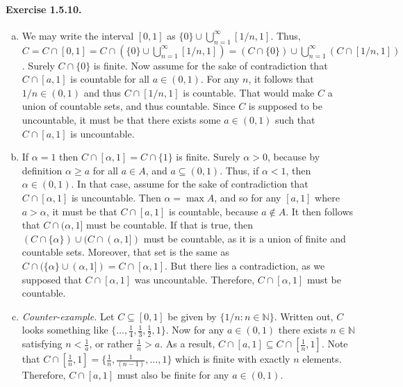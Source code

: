 \documentclass{article}
\newcommand{\N}{\mathbb{N}}
\begin{document}
\paragraph{Exercise 1.5.10.}
\begin{enumerate}[(a)]
    \item We may write the interval $[0,1]$ as $\{0\} \cup \bigcup_{n=1}^\infty [1/n,1]$. Thus, $C = C \cap [0,1] = C \cap \left(\{0\} \cup \bigcup_{n=1}^\infty [1/n,1]\right) = (C\cap\{0\}) \cup \bigcup_{n=1}^\infty(C \cap [1/n,1])$. Surely $C\cap \{0\}$ is finite. Now assume for the sake of contradiction that $C\cap [a,1]$ is countable for all $a\in(0,1)$. For any $n$, it follows that $1/n \in (0,1)$ and thus $C\cap [1/n,1]$ is countable. That would make $C$ a union of countable sets, and thus countable. Since $C$ is supposed to be uncountable, it must be that there exists some $a\in(0,1)$ such that $C\cap[a,1]$ is uncountable.
    \item If $\alpha = 1$ then $C \cap [\alpha,1]=C\cap\{1\}$ is finite. Surely $\alpha > 0$, because by definition $\alpha \geq a$ for all $a\in A$, and $a\subseteq (0,1)$. Thus, if $\alpha < 1$, then $\alpha \in (0,1)$. In that case, assume for the sake of contradiction that $C\cap[\alpha,1]$ is uncountable. Then $\alpha=\max A$, and so for any $[a,1]$ where $a>\alpha$, it must be that $C\cap[a,1]$ is countable, because $a \notin A$. It then follows that $C\cap(\alpha,1]$ must be countable. If that is true, then $(C\cap \{\alpha\})\cup (C\cap(\alpha,1])$ must be countable, as it is a union of finite and countable sets. Moreover, that set is the same as $C\cap(\{\alpha\}\cup(\alpha,1]) = C \cap [\alpha, 1]$. But there lies a contradiction, as we supposed that $C \cap [\alpha, 1]$ was uncountable. Therefore, $C \cap [\alpha, 1]$ must be countable.
    \item \textit{Counter-example.} Let $C\subseteq [0,1]$ be given by $\{1/n: n\in \N\}$. Written out, $C$ looks something like 
    $\{\ldots, \frac{1}{4}, \frac{1}{3}, \frac{1}{2}, 1\}$.
    Now for any $a\in(0,1)$ there exists $n \in \N$ satisfying $n < \frac{1}{a}$, or rather $\frac{1}{n}>a$. As a result, 
    $C \cap [a,1] \subseteq C \cap [\frac{1}{n},1]$. Note that $C\cap [\frac{1}{n},1] = \{\frac{1}{n}, \frac{1}{(n-1)}, \ldots, 1\}$ which is finite with exactly $n$ elements. Therefore, $C\cap[a,1]$ must also be finite for any $a\in(0,1)$.
\end{enumerate}
\end{document}
